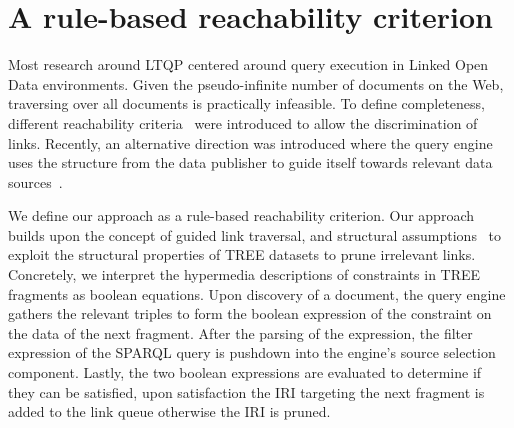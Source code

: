 \section{A rule-based reachability criterion}


Most research around LTQP centered around query execution in Linked Open Data environments.
Given the pseudo-infinite number of documents on the Web, traversing over all documents is practically infeasible.
To define completeness, different reachability criteria~\cite{hartig2012} were introduced to allow the discrimination of links.
Recently, an alternative direction was introduced where the query engine uses the structure from the data publisher to guide itself towards relevant data sources~\cite{taelman2023, verborgh2020}.

We define our approach as a rule-based reachability criterion.
Our approach builds upon the concept of guided link traversal, and structural assumptions~\cite{taelman2023} to exploit the structural properties of TREE datasets to prune irrelevant links.
Concretely, we interpret the hypermedia descriptions of constraints in TREE fragments as boolean equations.
Upon discovery of a document, the query engine gathers the relevant triples to form the boolean expression of the constraint on the data of the next fragment.
After the parsing of the expression, the filter expression of the SPARQL query is pushdown into the engine's source selection component.
Lastly, the two boolean expressions are evaluated to determine if they can be satisfied, upon satisfaction the IRI targeting the next fragment is added to the link queue otherwise the IRI is pruned.


